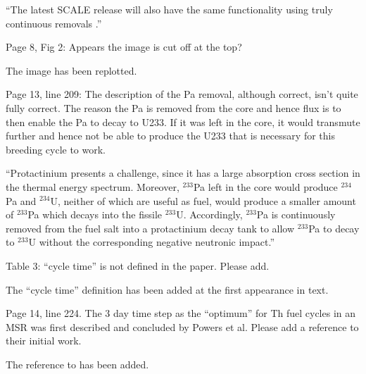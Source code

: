 \documentclass[answers,11pt]{exam}
\begin{document}
\begin{questions}
\begin{solution}
		        ``The latest SCALE release will also have the same functionality using 
        		truly continuous removals \cite{betzler_implementation_2017}.''
        \end{solution}

        \question  Page 8, Fig 2: Appears the image is cut off at the top?
        \begin{solution}
        The image has been replotted.
        \end{solution}

        \question  Page 13, line 209: The description of the Pa removal, 
        although correct, isn't quite fully correct. The reason the Pa is 
        removed from the core and hence flux is to then enable the Pa to decay 
        to U233. If it was left in the core, it would transmute further and 
        hence not be able to produce the U233 that is necessary for this 
        breeding cycle to work.
        \begin{solution}
        		``Protactinium presents a challenge, since it has a large absorption cross 
				section in the thermal energy spectrum. Moreover, $^{233}$Pa left in the core
				 would produce $^{234}$Pa and $^{234}$U, neither of which are useful as fuel, 
				 would produce a smaller amount of $^{233}$Pa which decays into the fissile $^{233}$U.
				Accordingly, $^{233}$Pa is continuously removed from the fuel salt into 
				a protactinium decay tank to allow $^{233}$Pa to decay to $^{233}$U 
				without the corresponding negative neutronic impact.''
        \end{solution}

        \question  Table 3: ``cycle time'' is not defined in the paper. Please 
        add.
        \begin{solution}
                        The ``cycle time'' definition has been added at the first 
                        appearance in text. 
        \end{solution}

        \question  Page 14, line 224. The 3 day time step as the ``optimum'' for 
        Th fuel cycles in an MSR was first described and concluded by Powers et 
        al. Please add a reference to their initial work.
        \begin{solution}
        		The reference to \cite{powers_new_2013} has been added.
        \end{solution}


\end{questions}
\end{document}
